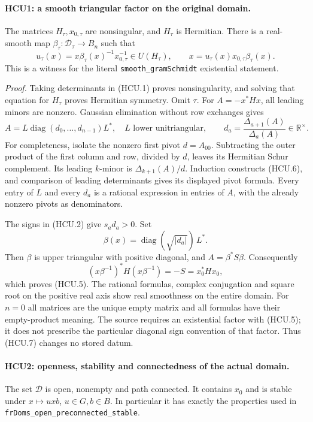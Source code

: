 \paragraph{HCU1: a smooth triangular factor on the original domain.}
\label{claim:HCU1}
The matrices \(H_\tau,x_{0,\tau}\) are nonsingular, and \(H_\tau\) is
Hermitian.  There is a real-smooth map
\(\beta_\tau:\mathcal D_\tau\to B_n\) such that
\[
 u_\tau(x)=x\beta_\tau(x)^{-1}x_{0,\tau}^{-1}\in U(H_\tau),
 \qquad x=u_\tau(x)x_{0,\tau}\beta_\tau(x).
 \tag{HCU.5}
\]
This is a witness for the literal
\texttt{smooth\_gramSchmidt} existential statement.

\emph{Proof.}
Taking determinants in (HCU.1) proves nonsingularity, and solving that
equation for \(H_\tau\) proves Hermitian symmetry.  Omit \(\tau\).
For \(A=-x^*Hx\), all leading minors are nonzero.  Gaussian elimination
without row exchanges gives
\[
 A=L\operatorname{diag}(d_0,\ldots,d_{n-1})L^*,
 \quad L\text{ lower unitriangular},\qquad
 d_a=\frac{\Delta_{a+1}(A)}{\Delta_a(A)}\in\mathbb R^\times .
 \tag{HCU.6}
\]
For completeness, isolate the nonzero first pivot \(d=A_{00}\).
Subtracting the outer product of the first column and row, divided by
\(d\), leaves its Hermitian Schur complement.  Its leading \(k\)-minor
is \(\Delta_{k+1}(A)/d\).  Induction constructs (HCU.6), and comparison
of leading determinants gives its displayed pivot formula.  Every
entry of \(L\) and every \(d_a\) is a rational expression in entries of
\(A\), with the already nonzero pivots as denominators.

The signs in (HCU.2) give \(s_a d_a>0\).  Set
\[
 \beta(x)=\operatorname{diag}(\sqrt{|d_a|})\,L^* .
 \tag{HCU.7}
\]
Then \(\beta\) is upper triangular with positive diagonal, and
\(A=\beta^*S\beta\).  Consequently
\[
 (x\beta^{-1})^*H(x\beta^{-1})=-S=x_0^*Hx_0,
\]
which proves (HCU.5).  The rational formulas, complex conjugation and square root on
the positive real axis show real smoothness on the entire domain.
For \(n=0\) all matrices are the unique empty matrix and all formulas
have their empty-product meaning.  The source requires an existential
factor with (HCU.5); it does not prescribe the particular diagonal
sign convention of that factor.  Thus (HCU.7) changes no stored datum.

\paragraph{HCU2: openness, stability and connectedness of the actual domain.}
\label{claim:HCU2}
The set \(\mathcal D\) is open, nonempty and path connected.  It contains
\(x_0\) and is stable under \(x\mapsto uxb\), \(u\in G,b\in B\).
In particular it has exactly the properties used in
\texttt{frDoms\_open\_preconnected\_stable}.

